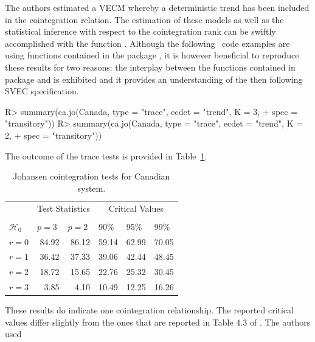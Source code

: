 \documentclass[nojss]{jss}
\begin{document}
The authors estimated a VECM whereby a deterministic trend has been
included in the cointegration relation. The estimation of these
models as well as the statistical inference with respect to the
cointegration rank can be swiftly accomplished with the function
. Although the following ~code examples are
using functions contained in the package , it is however
beneficial to reproduce these results for two reasons: the interplay
between the functions contained in package  and 
is exhibited and it provides an understanding of the then following
SVEC specification. 
\begin{Schunk}
\begin{Sinput}
R> summary(ca.jo(Canada, type = "trace", ecdet = "trend", K = 3, 
+    spec = "transitory"))
R> summary(ca.jo(Canada, type = "trace", ecdet = "trend", K = 2, 
+    spec = "transitory"))
\end{Sinput}
\end{Schunk}
The outcome of the trace tests is provided in Table~\ref{tab-4}.
\begin{table}[t]
\begin{center}
\begin{tabular}{@{}lrrlll@{}}
\toprule
\multicolumn{1}{l}{}&
\multicolumn{2}{c}{Test Statistics}&
\multicolumn{3}{c}{Critical Values}
\\
\cmidrule(l){2-3}
\cmidrule(l){4-6}
\\
\multicolumn{1}{l}{$\mathcal{H}_0$}&
\multicolumn{1}{l}{$p = 3$}&
\multicolumn{1}{l}{$p = 2$}&
\multicolumn{1}{l}{90\%}&
\multicolumn{1}{l}{95\%}&
\multicolumn{1}{l}{99\%}
\\
\midrule    
$r = 0$ & 84.92 & 86.12 & 
59.14 & 62.99 & 70.05\\
$r = 1$ & 36.42 & 37.33 & 
39.06 & 42.44 & 48.45\\
$r = 2$ & 18.72 & 15.65 & 
22.76 & 25.32 & 30.45\\
$r = 3$ & 3.85 & 4.10 & 
10.49 & 12.25 & 16.26\\
\bottomrule
\end{tabular}
\end{center}
\caption{Johansen cointegration tests for Canadian system.}
\label{tab-4}
\end{table}
These results do indicate one cointegration
relationship. The reported critical values differ slightly from the
ones that are reported in Table 4.3 of \citet{BRE2004}. The authors used
\end{document}
